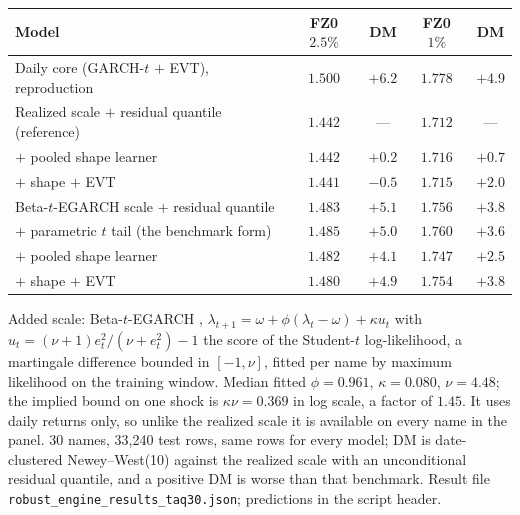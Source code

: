\begin{tabular}{lcccc}
\toprule
Model & FZ0 $2.5\%$ & DM & FZ0 $1\%$ & DM \\
\midrule
Daily core (GARCH-$t$ $+$ EVT), reproduction & $1.500$ & $+6.2$ & $1.778$ & $+4.9$ \\
Realized scale $+$ residual quantile (reference) & $1.442$ & --- & $1.712$ & --- \\
\quad $+$ pooled shape learner & $1.442$ & $+0.2$ & $1.716$ & $+0.7$ \\
\quad $+$ shape $+$ EVT & $1.441$ & $-0.5$ & $1.715$ & $+2.0$ \\
\midrule
Beta-$t$-EGARCH scale $+$ residual quantile & $1.483$ & $+5.1$ & $1.756$ & $+3.8$ \\
\quad $+$ parametric $t$ tail (the benchmark form) & $1.485$ & $+5.0$ & $1.760$ & $+3.6$ \\
\quad $+$ pooled shape learner & $1.482$ & $+4.1$ & $1.747$ & $+2.5$ \\
\quad $+$ shape $+$ EVT & $1.480$ & $+4.9$ & $1.754$ & $+3.8$ \\
\bottomrule
\end{tabular}
\begin{tablenotes}\footnotesize
\item Added scale: Beta-$t$-EGARCH \citep{harveychakravarty2008}, $\lambda_{t+1} = \omega + \phi(\lambda_t-\omega) + \kappa u_t$ with $u_t = (\nu+1)e_t^2/(\nu+e_t^2) - 1$ the score of the Student-$t$ log-likelihood, a martingale difference bounded in $[-1,\nu]$, fitted per name by maximum likelihood on the training window. Median fitted $\phi = 0.961$, $\kappa = 0.080$, $\nu = 4.48$; the implied bound on one shock is $\kappa\nu = 0.369$ in log scale, a factor of $1.45$. It uses daily returns only, so unlike the realized scale it is available on every name in the panel. 30 names, 33,240 test rows, same rows for every model; DM is date-clustered Newey--West(10) against the realized scale with an unconditional residual quantile, and a positive DM is worse than that benchmark. Result file \texttt{robust\_engine\_results\_taq30.json}; predictions in the script header.
\end{tablenotes}
